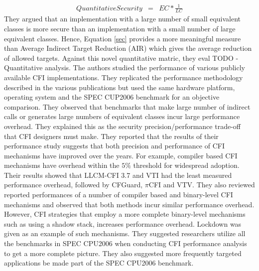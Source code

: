 \documentclass[dvips,12pt]{article}
\begin{document}
\begin{eqnarray}
QuantitativeSecurity &=& EC * \frac{1}{LC}
\label{sec}
\end{eqnarray}
\nolinebreak
They argued that an implementation with a large number of small equivalent classes is more secure than an implementation with a small number of large equivalent classes. Hence, Equation \ref{sec} provides a more meaningful measure than Average Indirect Target Reduction (AIR) which gives the average reduction of allowed targets. Against this novel quantitative matric, they eval TODO - Quantitative analysis.
\newline
\newline
The authors studied the performance of various publicly available CFI implementations. They replicated the performance methodology described in the various publications but used the same hardware platform, operating system and the SPEC CUP2006 benchmark for an objective comparison. They observed that benchmarks that make large number of indirect calls or generates large numbers of equivalent classes incur large performance overhead. They explained this as the security precision/performance trade-off that CFI designers must make. They reported that the results of their performance study suggests that both precision and performance of CFI mechanisms have improved over the years. For example, compiler based CFI mechanisms have overhead within the $5\%$ threshold for widespread adoption. Their results showed that LLCM-CFI 3.7 and VTI had the least measured performance overhead, followed by CFGuard, $\pi$CFI and VTV. They also reviewed reported performances of a number of compiler based and binary-level CFI mechanisms and observed that both methods incur similar performance overhead. However, CFI strategies that employ a more complete binary-level mechanisms such as using a shadow stack, increases performance overhead. Lockdown was given as an example of such mechanisms. They suggested researchers utilize all the benchmarks in SPEC CPU2006 when conducting CFI performance analysis to get a more complete picture. They also suggested more frequently targeted applications be made part of the SPEC CPU2006 benchmark.  
\newline
\newline
\end{document}

